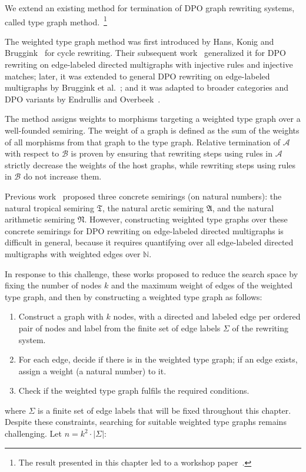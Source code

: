 We extend an existing method for termination of DPO graph rewriting systems, called type graph method.~\footnote{The result presented in this chapter led to a workshop paper~\cite{qiu2025termination_nwf_v2_acceptedgcm}.}

The weighted type graph method was first introduced by Hans, Konig and Bruggink~\cite{zantema2014termination} for cycle rewriting. Their subsequent work~\cite{bruggink2014termination} generalized it for DPO rewriting on edge-labeled directed multigraphs with injective rules and injective matches; later, it was extended to general DPO rewriting on edge-labeled multigraphs by Bruggink et al.~\cite{bruggink2015proving}; and it was adapted to broader categories and DPO variants by Endrullis and Overbeek~\cite{endrullis2024generalized_icgt}.

The method assigns weights to morphisms targeting a weighted type graph over a well-founded semiring. The weight of a graph is defined
 as the sum of the weights of all morphisms from that graph to the type graph. Relative termination of $\mathcal{A}$ with respect to $\mathcal{B}$ is proven by ensuring that rewriting steps using rules in \( \mathcal{A} \) strictly decrease the weights of the host graphs, while rewriting steps using rules in \( \mathcal{B} \) do not increase them.
    
   Previous work~\cite{zantema2014termination,bruggink2014termination,bruggink2015proving} proposed three concrete semirings (on natural numbers): the natural tropical semiring $\mathfrak{T}$, the natural arctic semiring $\mathfrak{A}$, and the natural arithmetic semiring $\mathfrak{N}$.
    However, constructing weighted type graphs over these concrete semirings for DPO rewriting on edge-labeled directed multigraphs is difficult in general, because it requires quantifying over all edge-labeled directed multigraphs with weighted edges over $\mathbb{N}$.

    In response to this challenge, these works proposed to reduce the search space by fixing the number of nodes \( k\) and the maximum weight of edges of the weighted type graph, and then by constructing a weighted type graph as follows: 
    \begin{enumerate}
      \item Construct a graph with \( k \) nodes, with a directed and labeled edge per ordered pair of nodes and label from the finite set of edge labels $\Sigma$ of the rewriting system. 
      \item For each edge, decide if there is in the weighted type graph;  if an edge exists, assign a weight (a natural number) to it.
      \item Check if the weighted type graph fulfils the required conditions.
    \end{enumerate}
    where $\Sigma$ is a finite set of edge labels that will be fixed throughout this chapter.
    Despite these constraints, searching for suitable weighted type graphs
    remains challenging. 
    Let $n \mathop{=} k^2 \cdot | \Sigma |$:
    
